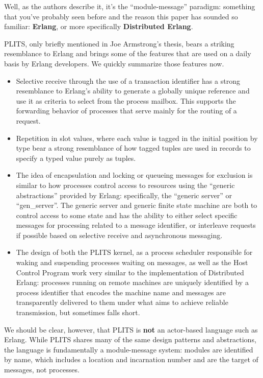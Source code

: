 Well, as the authors describe it, it's the ``module-message'' paradigm: something that you've probably seen before and the reason this paper has sounded so familiar: \textbf{Erlang}, or more specifically \textbf{Distributed Erlang}.  

PLITS, only briefly mentioned in Joe Armstrong's thesis, bears a striking resemblance to Erlang and brings some of the features that are used on a daily basis by Erlang developers.  We quickly summarize those features now.

\begin{itemize}
\item Selective receive through the use of a transaction identifier has a strong resemblance to Erlang's ability to generate a globally unique reference and use it as criteria to select from the process mailbox.  This supports the forwarding behavior of processes that serve mainly for the routing of a request.
\item Repetition in slot values, where each value is tagged in the initial position by type bear a strong resemblance of how tagged tuples are used in records to specify a typed value purely as tuples.  
\item The idea of encapsulation and locking or queueing messages for exclusion is similar to how processes control access to resources using the ``generic abstractions'' provided by Erlang: specifically, the ``generic server'' or ``gen\_server''.  The generic server and generic finite state machine are both to control access to some state and has the ability to either select specific messages for processing related to a message identifier, or interleave requests if possible based on selective receive and asynchronous messaging.
\item The design of both the PLITS kernel, as a process scheduler responsible for waking and suspending processes waiting on messages, as well as the Host Control Program work very similar to the implementation of Distributed Erlang: processes running on remote machines are uniquely identified by a process identifier that encodes the machine name and messages are transparently delivered to them under what aims to achieve reliable transmission, but sometimes falls short.
\end{itemize}

We should be clear, however, that PLITS is \textbf{not} an actor-based language such as Erlang.  While PLITS shares many of the same design patterns and abstractions, the language is fundamentally a module-message system: modules are identified by name, which includes a location and incarnation number and are the target of messages, not processes.
